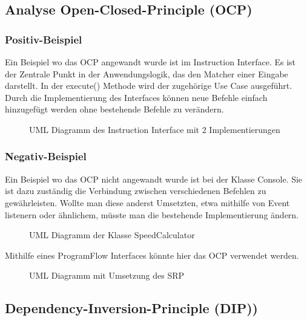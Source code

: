 \subsection{Analyse Open-Closed-Principle (OCP)}

\subsubsection{Positiv-Beispiel}

Ein Beispiel wo das OCP angewandt wurde ist im Instruction Interface. Es ist der Zentrale Punkt in der Anwendungslogik, das den Matcher einer Eingabe darstellt. In der execute() Methode wird der zugehörige Use Case ausgeführt. Durch die Implementierung des Interfaces können neue Befehle einfach hinzugefügt werden ohne bestehende Befehle zu verändern.

\begin{figure}[H]
  \centering
  
  \caption{UML Diagramm des Instruction Interface mit 2 Implementierungen}
\end{figure}

\subsubsection{Negativ-Beispiel}

Ein Beispiel wo das OCP nicht angewandt wurde ist bei der Klasse Console. Sie ist dazu zuständig die Verbindung zwischen verschiedenen Befehlen zu gewährleisten. Wollte man diese anderst Umsetzten, etwa mithilfe von Event listenern oder ähnlichem, müsste man die bestehende Implementierung ändern.

\begin{figure}[H]
  \centering
  
  \caption{UML Diagramm der Klasse SpeedCalculator}
\end{figure}

Mithilfe eines ProgramFlow Interfaces könnte hier das OCP verwendet werden.

\begin{figure}[H]
  \centering
  
  \caption{UML Diagramm mit Umsetzung des SRP}
\end{figure}


\subsection{Dependency-Inversion-Principle (DIP))}

